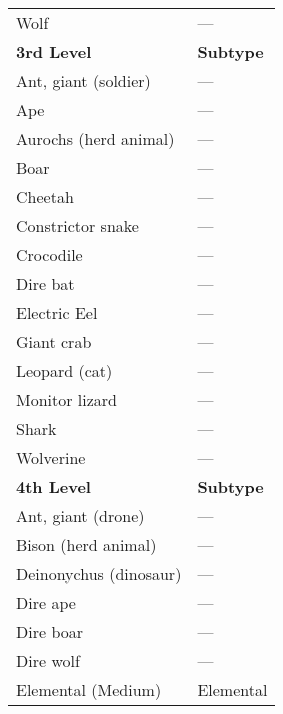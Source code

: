 \begin{tabular}{ll}
Wolf                                          & ---                \\
\textbf{3rd Level}                            & \textbf{Subtype} \\
Ant, giant (soldier)                          & ---                \\
Ape                                           & ---                \\
Aurochs (herd animal)                         & ---                \\
Boar                                          & ---                \\
Cheetah                                       & ---                \\
Constrictor snake                             & ---                \\
Crocodile                                     & ---                \\
Dire bat                                      & ---                \\
Electric Eel                                  & ---                \\
Giant crab                                    & ---                \\
Leopard (cat)                                 & ---                \\
Monitor lizard                                & ---                \\
Shark                                         & ---                \\
Wolverine                                     & ---                \\
\textbf{4th Level}                            & \textbf{Subtype} \\
Ant, giant (drone)                            & ---                \\
Bison (herd animal)                           & ---                \\
Deinonychus (dinosaur)                        & ---                \\
Dire ape                                      & ---                \\
Dire boar                                     & ---                \\
Dire wolf                                     & ---                \\
Elemental (Medium)                            & Elemental        \\

\end{tabular}
